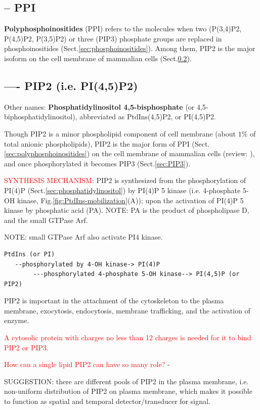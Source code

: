 \subsection{-- PPI}

{\bf Polyphosphoinositides} (PPI) refers to the molecules when two (P(3,4)P2,
P(4,5)P2, P(3,5)P2) or three (PIP3) phosphate groups are replaced in
phosphoinositides (Sect.\ref{sec:phosphoinositides}). Among them, PIP2 is the
major isoform on the cell membrane of mammalian cells (Sect.\ref{sec:PIP2}).

\subsection{---- PIP2 (i.e. PI(4,5)P2)}
\label{sec:PIP2}

Other names: {\bf Phosphatidylinositol 4,5-bisphosphate} (or
4,5-biphosphatidylinositol), abbreviated as PtdIns(4,5)P2, or PI(4,5)P2.

Though PIP2 is a minor phospholipid component of cell membrane (about $1\%$ of
total anionic phospholipids), PIP2 is the major form of PPI
(Sect.\ref{sec:polyphosphoinositides}) on the cell membrane of mammalian cells
(review: \citep{McLaughlin2002}), and once phosphorylated it becomes PIP3
(Sect.\ref{sec:PIP3}).


\textcolor{red}{SYNTHESIS MECHANISM}: PIP2 is synthesized from the
phosphorylation of PI(4)P (Sect.\ref{sec:phosphatidylinositol}) by PI(4)P 5
kinase (i.e. 4-phosphate 5-OH kinase, Fig.\ref{fig:PtdIns-mobilization}(A));
upon the activation of PI(4)P 5 kinase by phosphatic acid (PA).
NOTE: PA is the product of phospholipase D, and the small GTPase Arf.

NOTE: small GTPase Arf also activate PI4 kinase.

\begin{verbatim}
PtdIns (or PI) 
   --phosphorylated by 4-OH kinase-> PI(4)P 
        ---phosphorylated 4-phosphate 5-OH kinase--> PI(4,5)P (or PIP2) 
\end{verbatim}

\begin{mdframed}
PIP2 is important in the attachment of the cytoskeleton to the plasma membrane,
exocytosis, endocytosis, membrane trafficking, and the activation of enzyme. 

\textcolor{red}{A cytosolic protein with charges no less than 12 charges is
needed for it to bind PIP2 or PIP3.}

\textcolor{red}{How can a single lipid PIP2 can have so many role?} -

SUGGESTION: there are different pools of PIP2 in the plasma membrane, i.e.
non-uniform distribution of PIP2 on plasma membrane, which makes it possible to
function as spatial and temporal detector/transducer for signal.

\end{mdframed}

